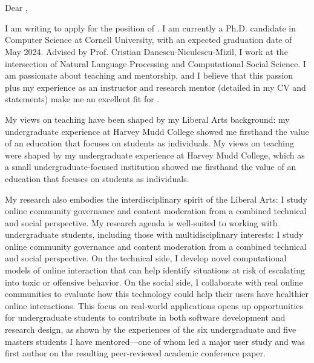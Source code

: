 \documentclass[12pt]{letter}
\begin{document}
\signature{Jonathan P. Chang}
\begin{letter}{
\department \\
\schoolnamelong \\
\schooladdress
}

\opening{
    Dear ,
}

I am writing to apply for the position of \position.
I am currently a Ph.D. candidate in Computer Science at Cornell University, with an expected graduation date of May 2024.
Advised by Prof. Cristian Danescu-Niculescu-Mizil, I work at the intersection of Natural Language Processing and Computational Social Science.
I am passionate about teaching and mentorship, and I believe that this passion plus my experience as an instructor and research mentor (detailed in my CV and statements) make me an excellent fit for \schoolname.

\ifliberalarts
My views on teaching have been shaped by my Liberal Arts background: my undergraduate experience at Harvey Mudd College showed me firsthand the value of an education that focuses on students as individuals.
\else
My views on teaching were shaped by my undergraduate experience at Harvey Mudd College, which as a small undergraduate-focused institution showed me firsthand the value of an education that focuses on students as individuals.
\fi
\coverteachingpara

\ifliberalarts
My research also embodies the interdisciplinary spirit of the Liberal Arts: I study online community governance and content moderation from a combined technical and social perspective.
\else
My research agenda is well-suited to working with undergraduate students, including those with multidisciplinary interests: I study online community governance and content moderation from a combined technical and social perspective.
\fi
On the technical side, I develop novel computational models of online interaction that can help identify situations at risk of escalating into toxic or offensive behavior.
On the social side, I collaborate with real online communities to evaluate how this technology could help their users have healthier online interactions.
This focus on real-world applications opens up opportunities for undergraduate students to contribute in both software development and research design, as shown by the experiences of the six undergraduate and five masters students I have mentored---one of whom led a major user study and was first author on the resulting peer-reviewed academic conference paper.
\coverresearchpara


\end{letter}
\end{document}
